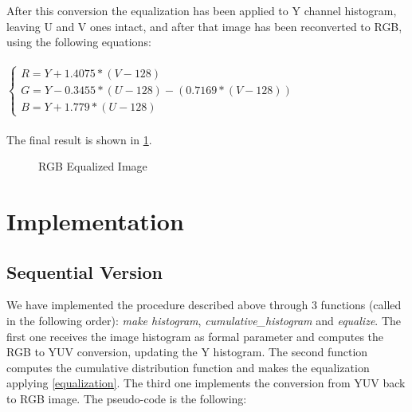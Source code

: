\documentclass[10pt,twocolumn,letterpaper]{article}
\begin{document}
After this conversion the equalization has been applied to Y channel histogram, leaving U and V ones intact, and after that image has been reconverted to RGB, using the following equations:\\
\\
$\begin{cases} 
R = Y + 1.4075 * (V - 128)\\
G = Y - 0.3455 * (U - 128) - (0.7169 * (V - 128))\\
B = Y + 1.779 * (U - 128)
\end{cases}$\\
\\
The final result is shown in \ref{fig:RGB_eq}.

\begin{figure}[h]
	\centering
	\qquad
	\caption{RGB Equalized Image}
	\label{fig:RGB_eq}
\end{figure}

\section{Implementation}
\subsection{Sequential Version}
We have implemented the procedure described above through 3 functions (called in the following order): \textit{make histogram}, \textit{cumulative\_histogram} and \textit{equalize}.
The first one receives the image histogram as formal parameter and computes the RGB to YUV conversion, updating the Y histogram. The second function computes the cumulative distribution function and makes the equalization applying \ref{equalization}. The third one implements the conversion from YUV back to RGB image. The pseudo-code is the following:
\end{document}

